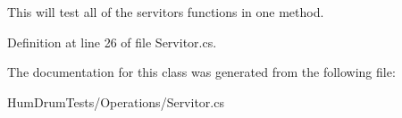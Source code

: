 This will test all of the servitor\textquotesingle{}s functions in one method. 



Definition at line 26 of file Servitor.\+cs.



The documentation for this class was generated from the following file\+:\begin{DoxyCompactItemize}
\item 
Hum\+Drum\+Tests/\+Operations/Servitor.\+cs\end{DoxyCompactItemize}

